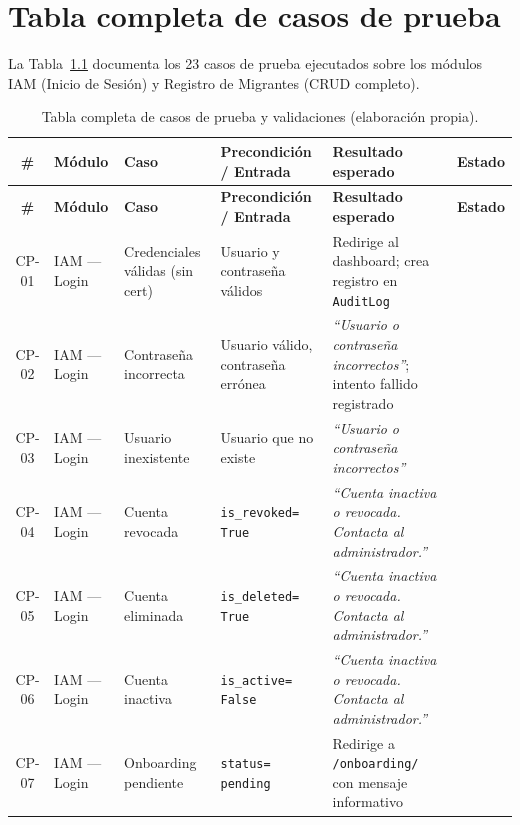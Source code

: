 \documentclass[10pt,letterpaper]{report}
\newcommand{\cmark}{\ding{51}}   %
\begin{document}
\chapter{Tabla completa de casos de prueba}
\label{anx:casos_prueba}

La Tabla~\ref{tab:cp_completo} documenta los 23 casos de prueba ejecutados sobre los módulos IAM (Inicio de Sesión) y Registro de Migrantes (CRUD completo).

\begingroup\small\sloppy
\begin{longtable}{c p{1.6cm} p{2.4cm} p{2.8cm} p{3.0cm} c}
\caption{Tabla completa de casos de prueba y validaciones (elaboración propia).}
\label{tab:cp_completo}\\
\toprule
\textbf{\#} & \textbf{Módulo} & \textbf{Caso} & \textbf{Precondición / Entrada} & \textbf{Resultado esperado} & \textbf{Estado}\\
\midrule
\endfirsthead
\toprule
\textbf{\#} & \textbf{Módulo} & \textbf{Caso} & \textbf{Precondición / Entrada} & \textbf{Resultado esperado} & \textbf{Estado}\\
\midrule
\endhead
\bottomrule
\endfoot
CP-01 & IAM --- Login & Credenciales válidas (sin cert) & Usuario y contraseña válidos & Redirige al dashboard; crea registro en \texttt{AuditLog} & \cmark \\[4pt]
CP-02 & IAM --- Login & Contraseña incorrecta & Usuario válido, contraseña errónea & \textit{``Usuario o contraseña incorrectos''}; intento fallido registrado & \cmark \\[4pt]
CP-03 & IAM --- Login & Usuario inexistente & Usuario que no existe & \textit{``Usuario o contraseña incorrectos''} & \cmark \\[4pt]
CP-04 & IAM --- Login & Cuenta revocada & \texttt{is\_revoked= True} & \textit{``Cuenta inactiva o revocada. Contacta al administrador.''} & \cmark \\[4pt]
CP-05 & IAM --- Login & Cuenta eliminada & \texttt{is\_deleted= True} & \textit{``Cuenta inactiva o revocada. Contacta al administrador.''} & \cmark \\[4pt]
CP-06 & IAM --- Login & Cuenta inactiva & \texttt{is\_active= False} & \textit{``Cuenta inactiva o revocada. Contacta al administrador.''} & \cmark \\[4pt]
CP-07 & IAM --- Login & Onboarding pendiente & \texttt{status= pending} & Redirige a \texttt{/onboarding/} con mensaje informativo & \cmark \\[4pt]

\end{longtable}
\end{document}
